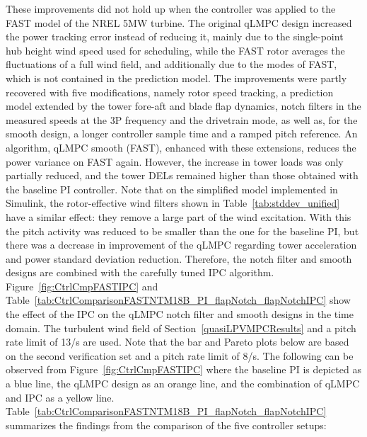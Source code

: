 These improvements did not hold up when the controller was applied to the FAST model of the NREL 5MW
turbine. The original qLMPC design increased the power tracking error instead of reducing it, mainly due to the single-point hub height wind speed used for scheduling, while the FAST rotor averages the fluctuations of a full wind field, and additionally due to the modes of FAST, which is not contained in the prediction model.
%
The improvements were partly recovered with five modifications, namely rotor speed tracking, a prediction model extended by the tower fore-aft and blade flap dynamics, notch filters in the measured speeds at the 3P frequency and the drivetrain mode, as well as, for the smooth design, a longer controller sample time and a ramped pitch reference.
%
An algorithm, qLMPC smooth (FAST), enhanced with these extensions, reduces the power variance on FAST again. However, the increase in tower
loads was only partially reduced, and the tower DELs remained higher than those obtained with the baseline PI controller. Note that on the simplified model implemented in Simulink, the
rotor-effective wind filters shown in Table~\ref{tab:stddev_unified} have a similar effect: they
remove a large part of the wind excitation. With this the pitch activity was reduced to be smaller than the one for the baseline PI, but there was a decrease in improvement of the
qLMPC regarding tower acceleration and power standard deviation reduction. 
%
Therefore, the notch filter and smooth designs are combined with the carefully tuned IPC algorithm. Figure~\ref{fig:CtrlCmpFASTIPC} and Table~\ref{tab:CtrlComparisonFASTNTM18B_PI_flapNotch_flapNotchIPC} show the effect of the IPC on the qLMPC notch filter and smooth designs in the time domain. The turbulent wind field of Section~\ref{quasiLPVMPCResults} and a pitch rate limit of 13\textdegree/s are used. Note that the bar and Pareto plots below are based on the second verification set and a pitch rate limit of 8\textdegree/s.
The following can be observed from  Figure~\ref{fig:CtrlCmpFASTIPC} where the baseline PI is depicted as a blue line, the qLMPC design as an orange line, and the combination of qLMPC and IPC as a yellow line. Table~\ref{tab:CtrlComparisonFASTNTM18B_PI_flapNotch_flapNotchIPC} summarizes the findings from the comparison of the five controller setups:
